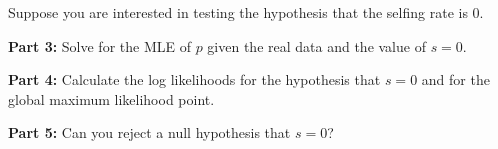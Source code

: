 \documentclass[11pt]{article}
\newcommand{\answer}[1]{}
\begin{document}
Suppose you are interested in testing the hypothesis that the selfing rate is 0.
\begin{compactenum}
	\item[{\bf Part 3:}] Solve for the MLE of $p$ given the real data and the value of $s = 0$.
\answer{
\begin{eqnarray*}
\ln L (s, p_A) & = &  n_{AA}\ln\left[p_A\left(\frac{s}{2} - \frac{sp_A}{2} + p_A\right)\right] + n_{Aa}\ln\left[(p_A - p_A^2)s + (2p_A - 2p_A^2)(1-s)\right] + \ldots \\
 & & \ldots + n_{aa}\ln\left[\left(\frac{2 - 3p_A + p_A^2}{2}\right)s + (1-p_A)^2(1-s)\right] \\
\ln L (s=0, p_A) & = &   n_{AA}\ln\left[p_A^2\right] + n_{Aa}\ln\left[2p_A - 2p_A^2\right] + n_{aa}\ln\left[(1-p_A)^2\right] \\
\frac{\partial\ln L (s=0, p_A)}{\partial p_A} & = &  \frac{n_{AA}2p_A}{p_A^2} + \frac{n_{Aa}(2-4p_A)}{2p_A - 2p_A^2} + \frac{n_{aa}(2)(1-p_A)(-1)}{(1-p_A)^2}\\
& = &  \frac{2n_{AA}}{p_A} + \frac{n_{Aa}(1-2p_A)}{p_A - p_A^2} - \frac{2n_{aa}}{(1-p_A)}\\
& = &  \frac{2n_{AA}(1-p_A) + n_{Aa}(1-2p_A)- 2n_{aa}p_A}{p_A - p_A^2}\\
& = &  \frac{2n_{AA} + n_{Aa} -2p_A (n_{AA} + n_{Aa} + n_{aa})}{p_A - p_A^2}\\
0 & = &  \frac{2n_{AA} + n_{Aa} -2\hat p_A (n_{AA} + n_{Aa} + n_{aa})}{\hat p_A - \hat p_A^2}\\
0 & = &  2n_{AA} + n_{Aa} -2\hat p_A (n_{AA} + n_{Aa} + n_{aa})\\
\hat p & = &  \frac{2n_{AA} + n_{Aa}}{2(n_{AA} + n_{Aa} + n_{aa})} \\
	& = & 0.6\\
\ln L (s=0, p_A=.6) & = & -514.974
\end{eqnarray*}
}
	\item[{\bf Part 4:}] Calculate the log likelihoods for the hypothesis that $s=0$ and  for the global maximum likelihood point.
\answer{
\begin{eqnarray*}
	\ln L (\hat s=0.1, p_A=0.6)& = & -514.35 \\
	\ln L (s=0, p_A=.6) & = & -514.974
\end{eqnarray*}
}
	\item[{\bf Part 5:}] Can you reject a null hypothesis that $s=0$?
\answer{
No.
}
\end{compactenum}
\end{document}
